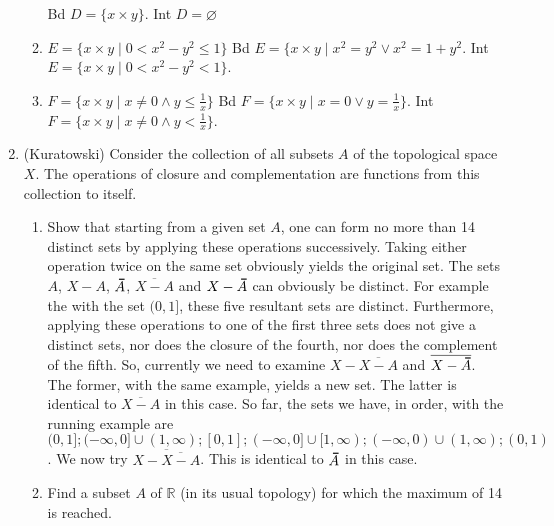 \documentclass[12pt,letterpaper]{article}
\newcommand{\n}{\break}
\let\emptyset\varnothing
\newcommand\thickbar[1]{\accentset{\rule{.4em}{.8pt}}{#1}}
\let\bar\thickbar
\begin{document}
\begin{enumerate}
\begin{enumerate}
    \indent Bd $D = \{x\times y\}$. Int $D = \emptyset$
    \item $E=\{x\times y\;|\;0<x^2-y^2\leq 1\}$\hspace{5in}\n
    \indent Bd $E = \{x\times y\;|\; x^2=y^2 \vee x^2=1+y^2$. Int $E=\{x\times y\;|\; 0<x^2-y^2<1\}$.
    \item $F=\{x\times y\;|\;x\neq 0 \wedge y\leq \frac{1}{x}\}$\hspace{5in}\n
    \indent Bd $F=\{x\times y\;|\; x=0 \vee y=\frac{1}{x}\}$. Int $F=\{x\times y\;|\; x\neq 0 \wedge y<\frac{1}{x}\}$.
  \end{enumerate}
  \item (Kuratowski) Consider the collection of all subsets $A$ of the topological space $X$. The operations of closure and complementation are functions from this collection to itself.
  \begin{enumerate}
    \item Show that starting from a given set $A$, one can form no more than 14 distinct sets by applying these operations successively.\n
    \indent Taking either operation twice on the same set obviously yields the original set.\n
    \indent The sets $A$, $X-A$, $\bar{A}$, $\overline{X-A}$ and $X-\bar{A}$ can obviously be distinct. For example the with the set $(0,1]$, these five resultant sets are distinct. Furthermore, applying these operations to one of the first three sets does not give a distinct sets, nor does the closure of the fourth, nor does the complement of the fifth.
    So, currently we need to examine $X-\overline{X-A}$ and $\overline{X-\bar{A}}$. The former, with the same example, yields a new set. The latter is identical to $\overline{X-A}$ in this case. \n
    So far, the sets we have, in order, with the running example are $(0,1]; (-\infty,0]\cup (1,\infty); [0,1]; (-\infty,0]\cup [1,\infty); (-\infty,0)\cup(1,\infty); (0,1)$.
    We now try $\overline{X-\overline{X-A}}$. This is identical to $\bar{A}$ in this case.
    \item Find a subset $A$ of $\mathbb{R}$ (in its usual topology) for which the maximum of 14 is reached.
  \end{enumerate}
\end{enumerate}
\end{document}
